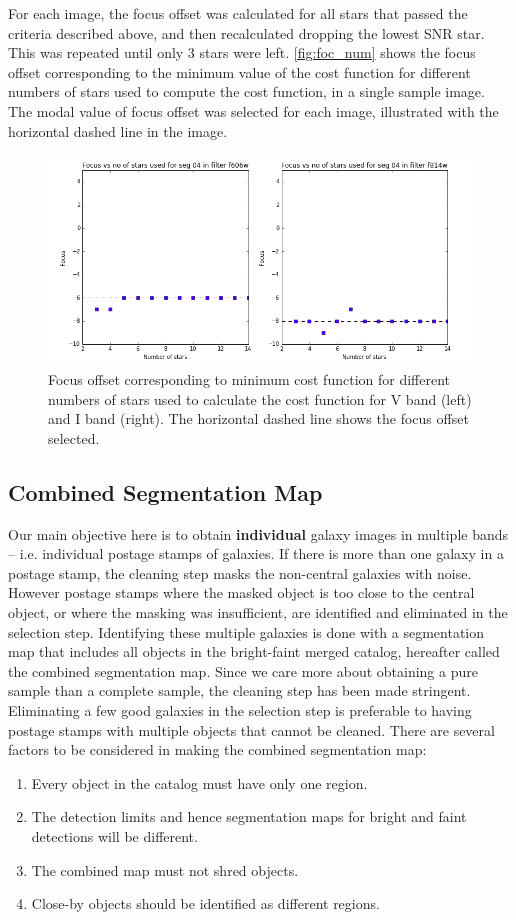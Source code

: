 \documentclass[a4paper,11pt]{article}
\begin{document}
For each image, the focus offset was calculated for all stars that passed the criteria described above, and then recalculated dropping the lowest SNR star. 
This was repeated until only 3 stars were left.
\autoref{fig:foc_num} shows the focus offset corresponding to the minimum value of the cost function for different numbers of stars used to compute the cost function, in a single sample image. 
The modal value of focus offset was selected for each image, illustrated with the horizontal dashed line in the image.
\begin{figure}[h]
\centering\includegraphics[width=0.8\linewidth]{foc_num_04.png}
\caption{Focus offset corresponding to minimum cost function for different numbers of stars used to calculate the cost function for V band (left) and I band (right).
The horizontal dashed line shows the focus offset selected.}
\label{fig:foc_num}
\end{figure}

\subsection{Combined Segmentation Map}
\label{ssec:com_seg}
Our main objective here is to obtain \textbf{individual} galaxy images in multiple bands -- i.e. individual postage stamps of galaxies. If there is more than one galaxy in a postage stamp, the cleaning step masks the non-central galaxies with noise. However postage stamps where the masked object is too close to the central object, or where the masking was insufficient, are identified and eliminated in the selection step.  Identifying these multiple galaxies is done with a segmentation map that includes all objects in the bright-faint merged catalog, hereafter called the combined segmentation map. Since we care more about obtaining a pure sample than a complete sample, the cleaning step has been made stringent. Eliminating a few good galaxies in the selection step is preferable to having postage stamps with multiple objects that cannot be cleaned.
There are several factors to be considered in making the combined segmentation map:
\begin{enumerate}
\item Every object in the catalog must have only one region. 
\item The detection limits and hence segmentation maps for bright and faint detections will be different. 
\item The combined map must not shred objects. 
\item Close-by objects should be identified as different regions.
\end{enumerate}
\end{document}
